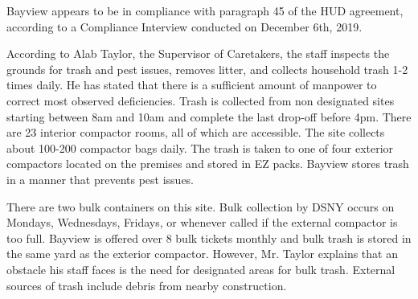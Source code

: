 

Bayview appears to be in compliance with paragraph 45 of the HUD agreement, according to a Compliance Interview conducted on December 6th, 2019. 

According to Alab Taylor, the Supervisor of Caretakers, the staff inspects the grounds for trash and pest issues, removes litter, and collects household trash 1-2 times daily. He has stated that there is a sufficient amount of manpower to correct most observed deficiencies. Trash is collected from non designated sites starting between 8am and 10am and complete the last drop-off before 4pm. There are 23 interior compactor rooms, all of which are accessible. The site collects about 100-200 compactor bags daily. The trash is taken to one of four exterior compactors located on the premises and stored in EZ packs. Bayview stores trash in a manner that prevents pest issues.

There are two bulk containers on this site. Bulk collection by DSNY occurs on Mondays, Wednesdays, Fridays, or whenever called if the external compactor is too full. Bayview is offered over 8 bulk tickets monthly and bulk trash is stored in the same yard as the exterior compactor. However, Mr. Taylor explains that an obstacle his staff faces is the need for designated areas for bulk trash. External sources of trash include debris from nearby construction. 